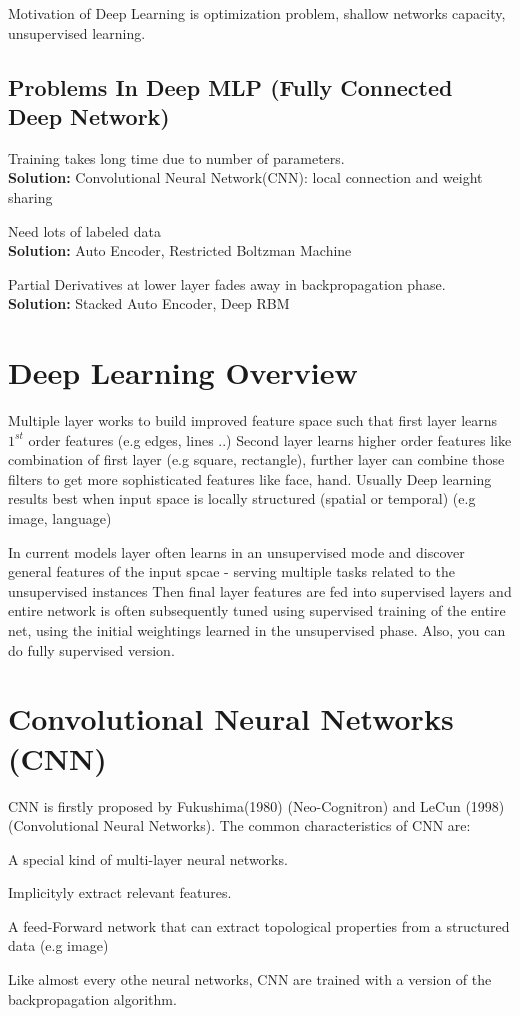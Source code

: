 \documentclass[12pt, a4paper, twoside]{book}
\begin{document}
Motivation of Deep Learning is optimization problem, shallow networks capacity, unsupervised learning.

\subsection{Problems In Deep MLP (Fully Connected Deep Network)}
\begin{steps}
    \item Training takes long time due to number of parameters.\\
    \textbf{Solution:} Convolutional Neural Network(CNN): local connection and weight sharing
    \item Need lots of labeled data \\
    \textbf{Solution:} Auto Encoder, Restricted Boltzman Machine
    \item Partial Derivatives at lower layer fades away in backpropagation phase. \\
    \textbf{Solution:} Stacked Auto Encoder, Deep RBM
\end{steps}

\section{Deep Learning Overview}

Multiple layer works to build improved feature space such that first layer learns $1^{st}$ order features (e.g edges, lines ..)
Second layer learns higher order features like combination of first layer (e.g square, rectangle), further layer can combine those filters to get more sophisticated features like face, hand. 
Usually Deep learning results best when input space is locally structured (spatial or temporal) (e.g image, language)

In current models layer often learns in an unsupervised mode and discover general features of the input spcae - serving multiple tasks related to the unsupervised instances
Then final layer features are fed into supervised layers and entire network is often subsequently tuned using supervised training of the entire net, using the initial weightings learned in the unsupervised phase.
Also, you can do fully supervised version.

\section{Convolutional Neural Networks (CNN)}

CNN is firstly proposed by Fukushima(1980) (Neo-Cognitron) and LeCun (1998) (Convolutional Neural Networks). The common characteristics of CNN are:
\begin{steps}
    \item A special kind of multi-layer neural networks.
    \item Implicityly extract relevant features.
    \item A feed-Forward network that can extract topological properties from a structured data (e.g image)
    \item Like almost every othe neural networks, CNN are trained with a version of the backpropagation algorithm.
\end{steps}
\end{document}

